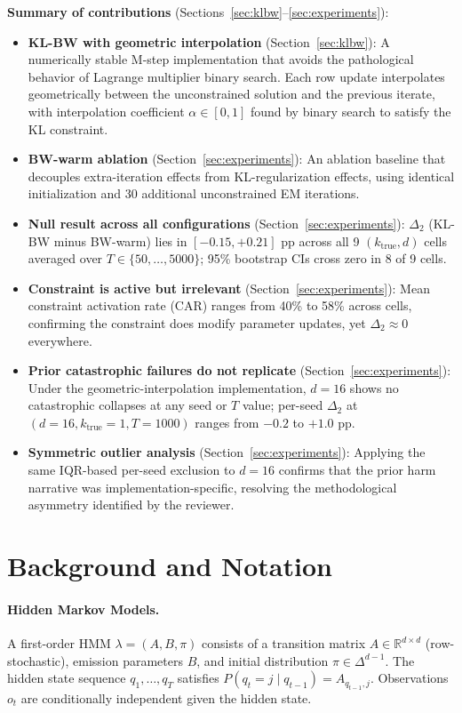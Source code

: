 \documentclass[11pt,letterpaper]{article}
\begin{document}
\noindent\textbf{Summary of contributions} (Sections~\ref{sec:klbw}--\ref{sec:experiments}):
\begin{itemize}
  \item \textbf{KL-BW with geometric interpolation} (Section~\ref{sec:klbw}): A numerically stable M-step implementation
  that avoids the pathological behavior of Lagrange multiplier binary search. Each row update interpolates geometrically
  between the unconstrained solution and the previous iterate, with interpolation coefficient $\alpha \in [0,1]$ found by
  binary search to satisfy the KL constraint.
  \item \textbf{BW-warm ablation} (Section~\ref{sec:experiments}): An ablation baseline that decouples extra-iteration
  effects from KL-regularization effects, using identical initialization and 30 additional unconstrained EM iterations.
  \item \textbf{Null result across all configurations} (Section~\ref{sec:experiments}): $\Delta_2$ (KL-BW minus BW-warm)
  lies in $[-0.15, +0.21]$ pp across all 9 $(k_\text{true}, d)$ cells averaged over $T \in \{50,\ldots,5000\}$; 95\%
  bootstrap CIs cross zero in 8 of 9 cells.
  \item \textbf{Constraint is active but irrelevant} (Section~\ref{sec:experiments}): Mean constraint activation rate (CAR)
  ranges from 40\% to 58\% across cells, confirming the constraint does modify parameter updates, yet $\Delta_2 \approx 0$
  everywhere.
  \item \textbf{Prior catastrophic failures do not replicate} (Section~\ref{sec:experiments}): Under the
  geometric-interpolation implementation, $d=16$ shows no catastrophic collapses at any seed or $T$ value; per-seed
  $\Delta_2$ at $(d=16, k_\text{true}=1, T=1000)$ ranges from $-0.2$ to $+1.0$ pp.
  \item \textbf{Symmetric outlier analysis} (Section~\ref{sec:experiments}): Applying the same IQR-based per-seed exclusion
  to $d=16$ confirms that the prior harm narrative was implementation-specific, resolving the methodological asymmetry
  identified by the reviewer.
\end{itemize}

\section{Background and Notation}

\paragraph{Hidden Markov Models.}
A first-order HMM $\lambda = (A, B, \pi)$ consists of a transition matrix $A \in \mathbb{R}^{d \times d}$ (row-stochastic),
emission parameters $B$, and initial distribution $\pi \in \Delta^{d-1}$. The hidden state sequence $q_1, \ldots, q_T$
satisfies $P(q_t = j \mid q_{t-1}) = A_{q_{t-1}, j}$. Observations $o_t$ are conditionally independent given the hidden state.
\end{document}
